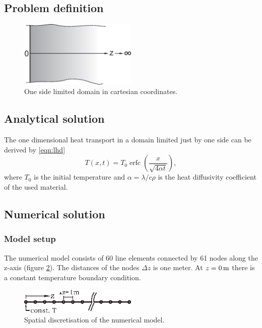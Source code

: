 \subsection{Problem definition}

\begin{figure}[h]
\centering
\includegraphics[width=0.5\textwidth]{T/figures/LHD.eps}
\caption{\label{figLHD}One side limited domain in cartesian coordinates.}
\end{figure}
\subsection{Analytical solution}

The one dimensional heat transport in a domain limited just by one side can be derived by \eqref{eqn:lhd}
\begin{equation}
T(x,t) = T_0 \operatorname{erfc} \left(\frac{x}{\sqrt{4\alpha t}}\right),
\label{eqn:lhd}
\end{equation}
where $T_0$ is the initial temperature and $\alpha = \lambda/c\rho$ is the heat diffusivity coefficient of the used material.

\subsection{Numerical solution}
\subsubsection{Model setup}

The numerical model consists of 60 line elements connected by 61 nodes along the z-axis (figure \ref{fig-ms-lhd}). The distances of the nodes $\Delta z$ is one meter. At $z=\unit[0]{m}$ there is a constant temperature boundary condition. 
\begin{figure}%
\centering
\includegraphics[width=0.5\textwidth]{T/figures/ms-lhd.eps}
\caption{\label{fig-ms-lhd}Spatial discretisation of the numerical model.}
\end{figure}
